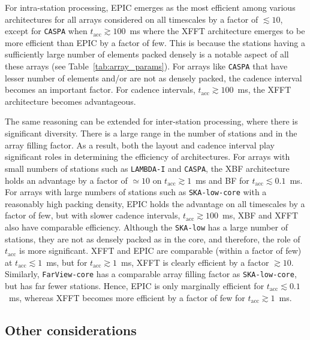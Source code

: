 \documentclass[
  journal=pasa,
  manuscript=article-type,
  year=2020,
  volume=37,
]{cup-journal}
\begin{document}
For intra-station processing, EPIC emerges as the most efficient among various architectures for all arrays considered on all timescales by a factor of $\lesssim 10$, except for \texttt{CASPA} when $t_\textrm{acc}\gtrsim 100$~ms where the XFFT architecture emerges to be more efficient than EPIC by a factor of few. This is because the stations having a sufficiently large number of elements packed densely is a notable aspect of all these arrays (see Table~\ref{tab:array_params}). For arrays like \texttt{CASPA} that have lesser number of elements and/or are not as densely packed, the cadence interval becomes an important factor. For cadence intervals, $t_\textrm{acc}\gtrsim 100$~ms, the XFFT architecture becomes advantageous.

The same reasoning can be extended for inter-station processing, where there is significant diversity. There is a large range in the number of stations and in the array filling factor. As a result, both the layout and cadence interval play significant roles in determining the efficiency of architectures. For arrays with small numbers of stations such as \texttt{LAMBDA-I} and \texttt{CASPA}, the XBF architecture holds an advantage by a factor of $\simeq 10$ on $t_\textrm{acc}\gtrsim 1$~ms and BF for $t_\textrm{acc}\lesssim 0.1$~ms. For arrays with large numbers of stations such as \texttt{SKA-low-core} with a reasonably high packing density, EPIC holds the advantage on all timescales by a factor of few, but with slower cadence intervals, $t_\textrm{acc}\gtrsim 100$~ms, XBF and XFFT also have comparable efficiency. Although the \texttt{SKA-low} has a large number of stations, they are not as densely packed as in the core, and therefore, the role of $t_\textrm{acc}$ is more significant. XFFT and EPIC are comparable (within a factor of few) at $t_\textrm{acc}\lesssim 1$~ms, but for $t_\textrm{acc}\gtrsim 1$~ms, XFFT is clearly efficient by a factor $\gtrsim 10$. Similarly, \texttt{FarView-core} has a comparable array filling factor as \texttt{SKA-low-core}, but has far fewer stations. Hence, EPIC is only marginally efficient for $t_\textrm{acc}\lesssim 0.1$~ms, whereas XFFT becomes more efficient by a factor of few for $t_\textrm{acc}\gtrsim 1$~ms. 

\subsection{Other considerations}\label{sec:other-metrics}
\end{document}

